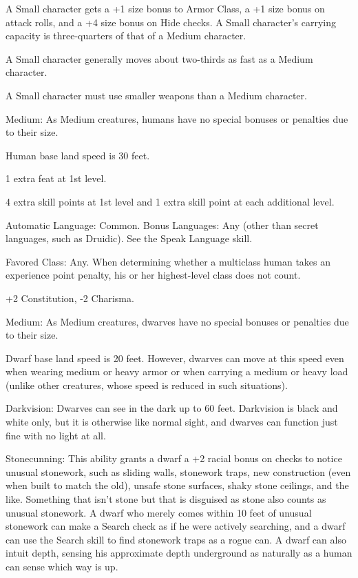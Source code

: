 A Small character gets a +1 size bonus to Armor Class, a +1 size bonus on attack 
rolls, and a +4 size bonus on Hide checks. A Small character's carrying capacity 
is three-quarters of that of a Medium character.

A Small character generally moves about two-thirds as fast as a Medium character.

A Small character must use smaller weapons than a Medium character.


Medium: As Medium creatures, humans have no special bonuses or penalties due to 
their size. 

Human base land speed is 30 feet. 

1 extra feat at 1st level.

4 extra skill points at 1st level and 1 extra skill point at each additional level.

Automatic Language: Common. Bonus Languages: Any (other than secret languages, 
such as Druidic). See the Speak Language skill. 

Favored Class: Any. When determining whether a multiclass human takes an experience 
point penalty, his or her highest-level class does not count.


+2 Constitution, -2 Charisma.

Medium: As Medium creatures, dwarves have no special bonuses or penalties due to 
their size.

Dwarf base land speed is 20 feet. However, dwarves can move at this speed even 
when wearing medium or heavy armor or when carrying a medium or heavy load (unlike 
other creatures, whose speed is reduced in such situations).

Darkvision: Dwarves can see in the dark up to 60 feet. Darkvision is black and 
white only, but it is otherwise like normal sight, and dwarves can function just 
fine with no light at all.

Stonecunning: This ability grants a dwarf a +2 racial bonus on  checks to 
notice unusual stonework, such as sliding walls, stonework traps, new construction 
(even when built to match the old), unsafe stone surfaces, shaky stone ceilings, 
and the like. Something that isn't stone but that is disguised as stone also counts 
as unusual stonework. A dwarf who merely comes within 10 feet of unusual stonework 
can make a Search check as if he were actively searching, and a dwarf can use the 
Search skill to find stonework traps as a rogue can. A dwarf can also intuit depth, 
sensing his approximate depth underground as naturally as a human can sense which 
way is up. 

